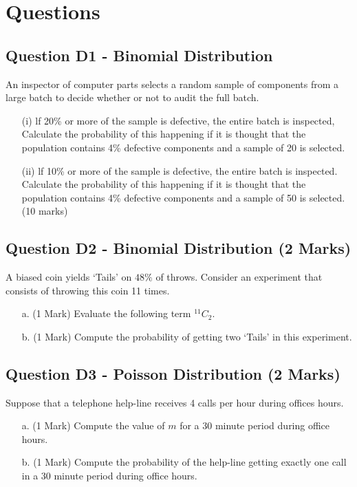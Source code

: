 






\chapter{Questions}
\section{Question D1 - Binomial Distribution } %
An inspector of computer parts selects a random sample of components
from a large batch to decide whether or not to audit the full batch.

\begin{itemize}
\item[(i)] lf 20\% or more of the sample is defective, the entire batch is
inspected, Calculate the probability of this happening if it is
thought that the population contains 4\% defective components and
a sample of 20 is selected.
\item[(ii)] lf 10\% or more of the sample is defective, the entire batch is
inspected. Calculate the probability of this happening if it is
thought that the population contains 4\% defective components and
a sample of 50 is selected.
(10 marks)
\end{itemize}


\section{Question D2 - Binomial Distribution (2 Marks) } %
A biased coin yields `Tails' on $48\%$ of throws. Consider an experiment that consists of throwing this coin 11 times.
\begin{itemize}
\item[a.] (1 Mark) Evaluate the following term $^{11}C_2$.
\item[b.] (1 Mark) Compute the probability of getting two `Tails' in this experiment.
\end{itemize}
\section{Question D3 -  Poisson Distribution (2 Marks) }  %
Suppose that a telephone help-line receives 4 calls per hour during offices hours.
\begin{itemize}
\item[a.] (1 Mark) Compute the value of $m$ for a 30 minute period during office hours.
\item[b.] (1 Mark) Compute the probability of the help-line getting exactly one call in a 30 minute period during office hours.
\end{itemize}

